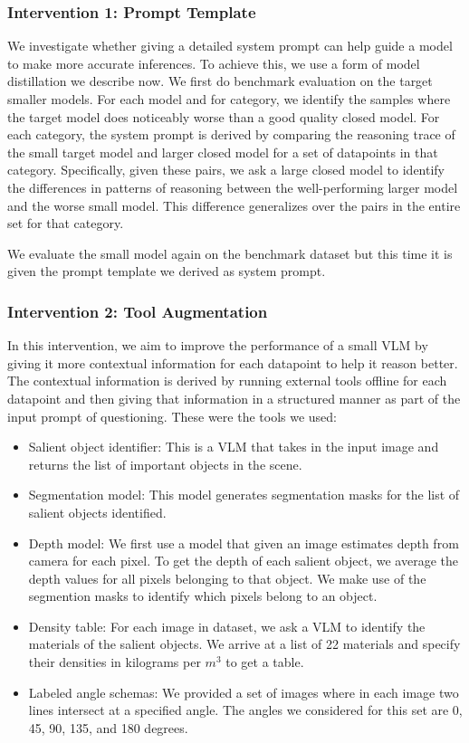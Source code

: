 \subsubsection{Intervention 1: Prompt Template}
We investigate whether giving a detailed system prompt can help guide a model to make more accurate inferences. To achieve this, we use a form of model distillation we describe now. We first do benchmark evaluation on the target smaller models. For each model and for category, we identify the samples where the target model does noticeably worse than a good quality closed model. For each category, the system prompt is derived by comparing the reasoning trace of the small target model and larger closed model for a set of datapoints in that category. Specifically, given these pairs, we ask a large closed model to identify the differences in patterns of reasoning between the well-performing larger model and the worse small model. This difference generalizes over the pairs in the entire set for that category.

We evaluate the small model again on the benchmark dataset but this time it is given the prompt template we derived as system prompt.

\subsubsection{Intervention 2: Tool Augmentation}
In this intervention, we aim to improve the performance of a small VLM by giving it more contextual information for each datapoint to help it reason better. The contextual information is derived by running external tools offline for each datapoint and then giving that information in a structured manner as part of the input prompt of questioning. These were the tools we used:

\begin{itemize}
\item Salient object identifier: This is a VLM that takes in the input image and returns the list of important objects in the scene.
\item Segmentation model: This model generates segmentation masks for the list of salient objects identified. 
\item Depth model: We first use a model that given an image estimates depth from camera for each pixel. To get the depth of each salient object, we average the depth values for all pixels belonging to that object. We make use of the segmention masks to identify which pixels belong to an object.
\item Density table: For each image in dataset, we ask a VLM to identify the materials of the salient objects. We arrive at a list of 22 materials and specify their densities in kilograms per $m^3$ to get a table.
\item Labeled angle schemas: We provided a set of images where in each image two lines intersect at a specified angle. The angles we considered for this set are 0, 45, 90, 135, and 180 degrees.
\end{itemize}

